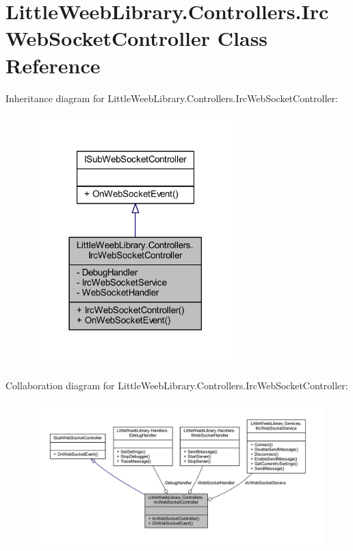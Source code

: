 \hypertarget{class_little_weeb_library_1_1_controllers_1_1_irc_web_socket_controller}{}\section{Little\+Weeb\+Library.\+Controllers.\+Irc\+Web\+Socket\+Controller Class Reference}
\label{class_little_weeb_library_1_1_controllers_1_1_irc_web_socket_controller}


Inheritance diagram for Little\+Weeb\+Library.\+Controllers.\+Irc\+Web\+Socket\+Controller\+:\nopagebreak
\begin{figure}[H]
\begin{center}
\leavevmode
\includegraphics[width=225pt]{class_little_weeb_library_1_1_controllers_1_1_irc_web_socket_controller__inherit__graph}
\end{center}
\end{figure}


Collaboration diagram for Little\+Weeb\+Library.\+Controllers.\+Irc\+Web\+Socket\+Controller\+:\nopagebreak
\begin{figure}[H]
\begin{center}
\leavevmode
\includegraphics[width=350pt]{class_little_weeb_library_1_1_controllers_1_1_irc_web_socket_controller__coll__graph}
\end{center}
\end{figure}
